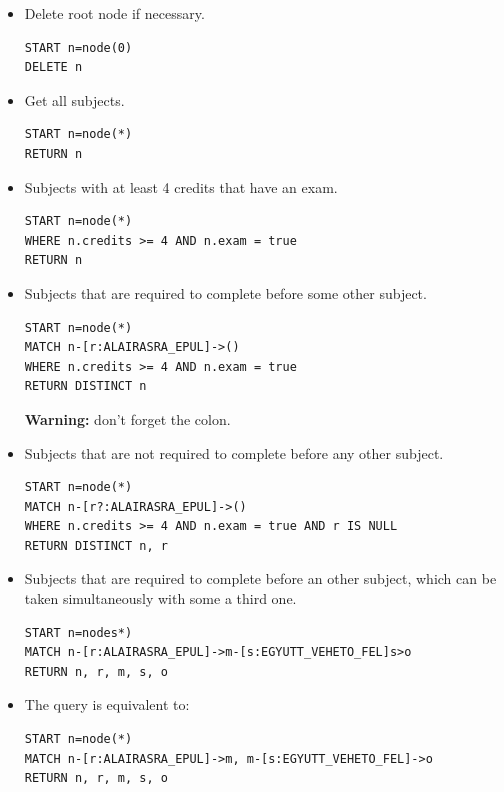 \documentclass[]{report}
\begin{document}
\begin{itemize}
\item
  Delete root node if necessary.

\begin{verbatim}
START n=node(0) 
DELETE n
\end{verbatim}
\item
  Get all subjects.

\begin{verbatim}
START n=node(*) 
RETURN n
\end{verbatim}
\item
  Subjects with at least 4 credits that have an exam.

\begin{verbatim}
START n=node(*) 
WHERE n.credits >= 4 AND n.exam = true 
RETURN n
\end{verbatim}
\item
  Subjects that are required to complete before some other subject.

\begin{verbatim}
START n=node(*) 
MATCH n-[r:ALAIRASRA_EPUL]->() 
WHERE n.credits >= 4 AND n.exam = true 
RETURN DISTINCT n
\end{verbatim}

  \textbf{Warning:} don't forget the colon.
\item
  Subjects that are not required to complete before any other subject.

\begin{verbatim}
START n=node(*) 
MATCH n-[r?:ALAIRASRA_EPUL]->() 
WHERE n.credits >= 4 AND n.exam = true AND r IS NULL 
RETURN DISTINCT n, r
\end{verbatim}
\item
  Subjects that are required to complete before an other subject, which
  can be taken simultaneously with some a third one.

\begin{verbatim}
START n=nodes*) 
MATCH n-[r:ALAIRASRA_EPUL]->m-[s:EGYUTT_VEHETO_FEL]s>o 
RETURN n, r, m, s, o
\end{verbatim}
\item
  The query is equivalent to:

\begin{verbatim}
START n=node(*) 
MATCH n-[r:ALAIRASRA_EPUL]->m, m-[s:EGYUTT_VEHETO_FEL]->o 
RETURN n, r, m, s, o
\end{verbatim}
\end{itemize}
\end{document}

